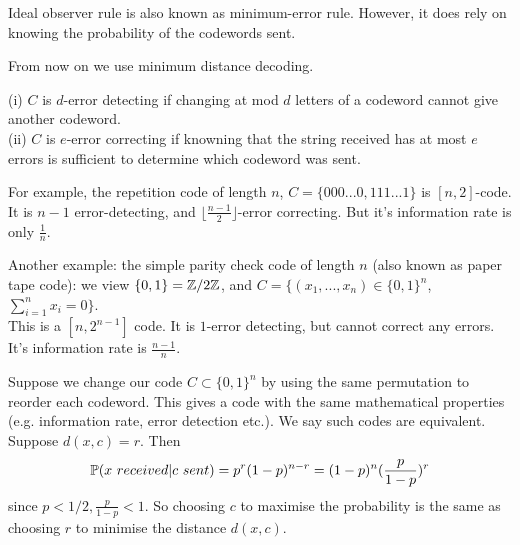 \documentclass[a4paper]{article}
\begin{document}
\begin{rem}
Ideal observer rule is also known as minimum-error rule. However, it does rely on knowing the probability of the codewords sent.
\end{rem}

From now on we use minimum distance decoding.

\begin{defi}
(i) $C$ is $d$-error detecting if changing at mod $d$ letters of a codeword cannot give another codeword.\\
(ii) $C$ is $e$-error correcting if knowning that the string received has at most $e$ errors is sufficient to determine which codeword was sent.
\end{defi}

For example, the repetition code of length $n$, $C = \{000...0,111...1\}$ is $[n,2]$-code. It is $n-1$ error-detecting, and $\lfloor \frac{n-1}{2}\rfloor$-error correcting. But it's information rate is only $\frac{1}{n}$.

Another example: the simple parity check code of length $n$ (also known as paper tape code): we view $\{0,1\} = \Z/2\Z$, and $C = \{(x_1,...,x_n) \in \{0,1\}^n$, $\sum_{i=1}^n x_i = 0\}$.\\
This is a $[n,2^{n-1}]$ code. It is $1$-error detecting, but cannot correct any errors. It's information rate is $\frac{n-1}{n}$.

\begin{rem}
Suppose we change our code $C \subset \{0,1\}^n$ by using the same permutation to reorder each codeword. This gives a code with the same mathematical properties (e.g. information rate, error detection etc.). We say such codes are equivalent.\\
Suppose $d(x,c) = r$. Then
\begin{equation*}
\begin{aligned}
\P(x\ received | c\ sent) = p^r (1-p)^{n-r} = (1-p)^n (\frac{p}{1-p})^r
\end{aligned}
\end{equation*}
since $p<1/2, \frac{p}{1-p} < 1$. So choosing $c$ to maximise the probability is the same as choosing $r$ to minimise the distance $d(x,c)$.
\end{rem}
\end{document}
